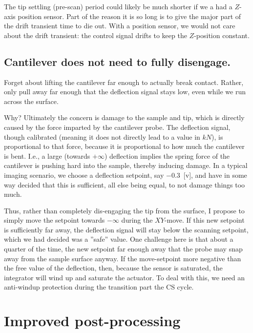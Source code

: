 \documentclass[11pt]{article}
\begin{document}
\begin{enumerate}
{The tip settling (pre-scan) period could likely be much shorter if we a had a $Z$-axis position sensor. Part of the reason it is so long is to give the major part of the drift transient time to die out. With a position sensor, we would not care about the drift transient: the control signal drifts to keep the $Z$-position constant.
}
\end{enumerate}

\subsection{Cantilever does not need to fully disengage.} Forget about lifting the cantilever far enough to actually break contact. Rather, only pull away far enough that the deflection signal stays low, even while we run across the surface.

Why? Ultimately the concern is damage to the sample and tip, which is directly caused by the force imparted by the cantilever probe. The deflection signal, though calibrated (meaning it does not directly lead to a value in $kN$), is proportional to that force, because it is proportional to how much the cantilever is bent. I.e., a large (towards $+\infty$) deflection implies the spring force of the cantilever is pushing hard into the sample, thereby inducing damage. In a typical imaging scenario, we choose a deflection setpoint, say $-0.3$~[v], and have in some way decided that this is sufficient, all else being equal, to not damage things too much.

Thus, rather than completely dis-engaging the tip from the surface, I propose to simply move the setpoint towards $-\infty$ during the $XY$-move. If this new setpoint is sufficiently far away, the deflection signal will stay below the scanning setpoint, which we had decided was a ''safe'' value. One challenge here is that about a quarter of the time, the new setpoint far enough away that the probe may snap away from the sample surface anyway. If the move-setpoint more negative than the free value of the deflection, then, because the sensor is saturated, the integrator will wind up and saturate the actuator. To deal with this, we need an anti-windup protection during the transition part the CS cycle.


\section{Improved post-processing}
\end{document}
